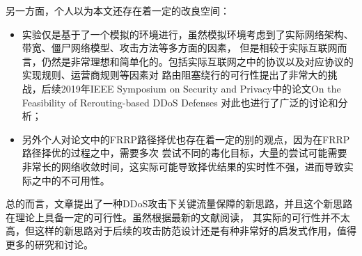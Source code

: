 \documentclass[a4paper]{article}
\begin{document}
另一方面，个人以为本文还存在着一定的改良空间：
\begin{itemize}
  \item 实验仅是基于了一个模拟的环境进行，虽然模拟环境考虑到了实际网络架构、带宽、僵尸网络模型、攻击方法等多方面的因素，
  但是相较于实际互联网而言，仍然是非常理想和简单化的。包括实际互联网之中的协议以及对应协议的实现规则、运营商规则等因素对
  路由阻塞绕行的可行性提出了非常大的挑战，后续2019年IEEE Symposium on Security and Privacy中的论文On the Feasibility of Rerouting-based DDoS Defenses
  对此也进行了广泛的讨论和分析；
  \item 另外个人对论文中的FRRP路径择优也存在着一定的别的观点，因为在FRRP路径择优的过程之中，需要多次
  尝试不同的毒化目标，大量的尝试可能需要非常长的网络收敛时间，这实际可能导致择优结果的实时性不强，进而导致实际之中的不可用性。
\end{itemize}

总的而言，文章提出了一种DDoS攻击下关键流量保障的新思路，并且这个新思路在理论上具备一定的可行性。虽然根据最新的文献阅读，
其实际的可行性并不太高，但这样的新思路对于后续的攻击防范设计还是有种非常好的启发式作用，值得更多的研究和讨论。
\end{document}

